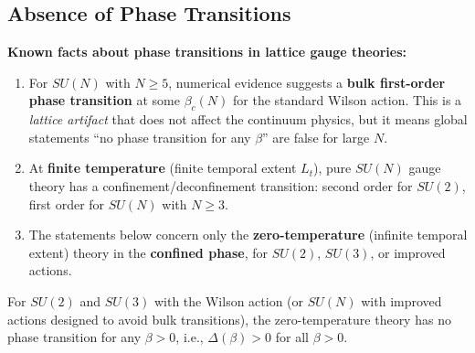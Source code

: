 \subsection{Absence of Phase Transitions}

\begin{tcolorbox}[colback=orange!5!white, colframe=orange!75!black, title=\textbf{Important Caveat on Phase Transitions}]
\textbf{Known facts about phase transitions in lattice gauge theories:}
\begin{enumerate}
\item For $SU(N)$ with $N \geq 5$, numerical evidence suggests a \textbf{bulk first-order 
phase transition} at some $\beta_c(N)$ for the standard Wilson action. This is a 
\emph{lattice artifact} that does not affect the continuum physics, but it means 
global statements ``no phase transition for any $\beta$'' are false for large $N$.
\item At \textbf{finite temperature} (finite temporal extent $L_t$), pure $SU(N)$ gauge 
theory has a confinement/deconfinement transition: second order for $SU(2)$, 
first order for $SU(N)$ with $N \geq 3$.
\item The statements below concern only the \textbf{zero-temperature} (infinite temporal 
extent) theory in the \textbf{confined phase}, for $SU(2)$, $SU(3)$, or improved actions.
\end{enumerate}
\end{tcolorbox}

\begin{theorem}
\label{thm:no-transition}
For $SU(2)$ and $SU(3)$ with the Wilson action (or $SU(N)$ with improved actions 
designed to avoid bulk transitions), the zero-temperature theory has no phase 
transition for any $\beta > 0$, i.e., $\Delta(\beta) > 0$ for all $\beta > 0$.
\end{theorem}

